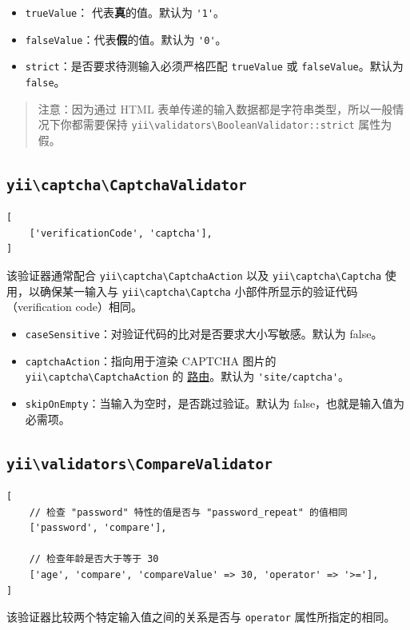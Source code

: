\begin{itemize}
\item \lstinline|trueValue|： 代表\textbf{真}的值。默认为 \lstinline|'1'|。
\item \lstinline|falseValue|：代表\textbf{假}的值。默认为 \lstinline|'0'|。
\item \lstinline|strict|：是否要求待测输入必须严格匹配 \lstinline|trueValue| 或 \lstinline|falseValue|。默认为 \lstinline|false|。
\end{itemize}
\begin{quote}注意：因为通过 HTML 表单传递的输入数据都是字符串类型，所以一般情况下你都需要保持
  \texttt{yii{\allowbreak{}\textbackslash}validators{\allowbreak{}\textbackslash}BooleanValidator\allowbreak{}::\allowbreak{}strict} 属性为假。

\end{quote}
\subsection{\texttt{yii{\allowbreak{}\textbackslash}captcha{\allowbreak{}\textbackslash}CaptchaValidator} \label{tutorial-core-validators.md::captcha}}
\lstset{language=php}\begin{lstlisting}
[
    ['verificationCode', 'captcha'],
]
\end{lstlisting}
该验证器通常配合 \texttt{yii{\allowbreak{}\textbackslash}captcha{\allowbreak{}\textbackslash}CaptchaAction} 以及 \texttt{yii{\allowbreak{}\textbackslash}captcha{\allowbreak{}\textbackslash}Captcha}
使用，以确保某一输入与 \texttt{yii{\allowbreak{}\textbackslash}captcha{\allowbreak{}\textbackslash}Captcha} 小部件所显示的验证代码（verification code）相同。

\begin{itemize}
\item \lstinline|caseSensitive|：对验证代码的比对是否要求大小写敏感。默认为 false。
\item \lstinline|captchaAction|：指向用于渲染 CAPTCHA 图片的 \texttt{yii{\allowbreak{}\textbackslash}captcha{\allowbreak{}\textbackslash}CaptchaAction} 的 \hyperref[structure-controllers.md::routes]{路由}。默认为 \lstinline|'site/captcha'|。
\item \lstinline|skipOnEmpty|：当输入为空时，是否跳过验证。默认为 false，也就是输入值为必需项。
\end{itemize}
\subsection{\texttt{yii{\allowbreak{}\textbackslash}validators{\allowbreak{}\textbackslash}CompareValidator} \label{tutorial-core-validators.md::compare}}
\lstset{language=php}\begin{lstlisting}
[
    // 检查 "password" 特性的值是否与 "password_repeat" 的值相同
    ['password', 'compare'],

    // 检查年龄是否大于等于 30
    ['age', 'compare', 'compareValue' => 30, 'operator' => '>='],
]
\end{lstlisting}
该验证器比较两个特定输入值之间的关系是否与 \lstinline|operator| 属性所指定的相同。

